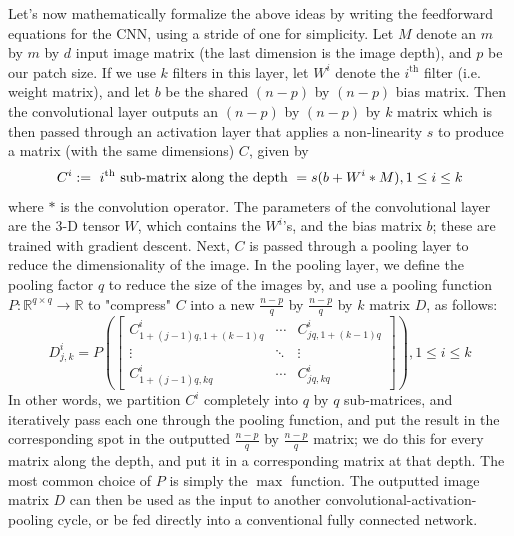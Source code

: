 \documentclass{article}
\begin{document}
Let's now mathematically formalize the above ideas by writing the feedforward equations for the CNN, using a stride of one for simplicity. Let $ M $ denote an $ m $ by $ m $ by $ d $ input image matrix (the last dimension is the image depth), and $ p $ be our patch size. If we use $ k $ filters in this layer, let $ W^i $ denote the $ i^{\text{th}} $ filter (i.e. weight matrix), and let $ b $ be the shared $ (n - p) $ by $ (n - p) $ bias matrix. Then the convolutional layer outputs an $ (n - p) $ by $ (n - p) $ by $ k $ matrix which is then passed through an activation layer that applies a non-linearity $ s $ to produce a matrix (with the same dimensions) $ C $, given by
$$ C^i := \text{ $ i^{\text{th}} $ sub-matrix along the depth } = s(b + W^i * M), 1 \leq i \leq k $$
where $ * $ is the convolution operator. The parameters of the convolutional layer are the 3-D tensor $ W $, which contains the $ W^i $'s, and the bias matrix $ b $; these are trained with gradient descent. Next, $ C $ is passed through a pooling layer to reduce the dimensionality of the image. In the pooling layer, we define the pooling factor $ q $ to reduce the size of the images by, and use a pooling function $ P: \mathbb{R}^{q \times q} \rightarrow \mathbb{R} $ to "compress" $ C $ into a new $ \frac{n - p}{q} $ by $ \frac{n - p}{q} $ by $ k $ matrix $ D $, as follows:
$$ D^i_{j, k} = P \left( 
    \begin{bmatrix}
        C^i_{1 + (j - 1) q, 1 + (k - 1) q} & \cdots & C^i_{j q, 1 + (k - 1) q} \\
        \vdots & \ddots & \vdots \\
        C^i_{1 + (j - 1) q, k q} & \cdots & C^i_{j q, k q}
    \end{bmatrix}
\right), 1 \leq i \leq k $$
In other words, we partition $ C^i $ completely into $ q $ by $ q $ sub-matrices, and iteratively pass each one through the pooling function, and put the result in the corresponding spot in the outputted $ \frac{n - p}{q} $ by $ \frac{n - p}{q} $ matrix; we do this for every matrix along the depth, and put it in a corresponding matrix at that depth. The most common choice of $ P $ is simply the $ \max $ function. The outputted image matrix $ D $ can then be used as the input to another convolutional-activation-pooling cycle, or be fed directly into a conventional fully connected network.
\end{document}

